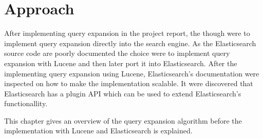\chapter{Approach}
\label{ch:approach}
After implementing query expansion in the project report,
the though were to implement query expansion directly into the search engine.
As the Elasticsearch source code are poorly documented the choice were to implement query expansion with Lucene and then later port it into Elasticsearch.
After the implementing query expansion using Lucene,
Elasticsearch's documentation were inspected on how to make the implementation scalable.
It were discovered that Elasticsearch has a plugin API which can be used to extend Elasticsearch's functionallity.

This chapter gives an overview of the query expansion algorithm before the implementation with Lucene and Elasticsearch is explained.



\cleardoublepage
